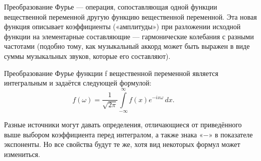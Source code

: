 \documentclass[a4paper,11pt]{book}
\begin{document}
	Преобразование Фурье — операция, сопоставляющая одной функции вещественной переменной другую функцию вещественной переменной. Эта новая функция описывает коэффициенты («амплитуды») при разложении исходной функции на элементарные составляющие — гармонические колебания с разными частотами (подобно тому, как музыкальный аккорд может быть выражен в виде суммы музыкальных звуков, которые его составляют).

    Преобразование Фурье функции f вещественной переменной является интегральным и задаётся следующей формулой:
	\[\boxed{f(\omega)=\frac{1}{\sqrt{2\pi}}  \int\limits_{-\infty}^\infty f(x) e^{-ix\omega}  \,dx.}  \qquad \]
	
	Разные источники могут давать определения, отличающиеся от приведённого выше выбором коэффициента перед интегралом, а также знака «−» в показателе экспоненты. Но все свойства будут те же, хотя вид некоторых формул может измениться.
	
\end{document}
